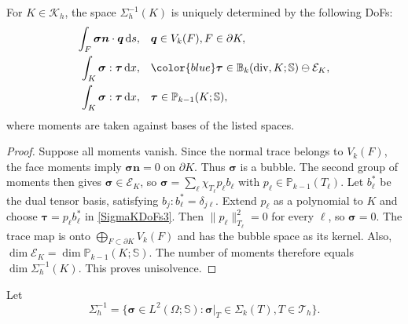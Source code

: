 \documentclass[review,hidelinks,onefignum,onetabnum]{siamart251216}
\renewcommand{\div}{\operatorname{div}}
\newcommand{\dx}{\,{\rm d}x}
\newcommand{\ds}{\,{\rm d}s}
\newcommand{\AI}[1]{{\color{blue}#1}}
\begin{document}
\begin{lemma}\label{lemma_DOF}
For $K\in\mathcal{K}_h$, the space $\Sigma_h^{-1}(K)$ is uniquely determined by the following DoFs:
\begin{subequations}
\label{SigmaKDoFs}
\begin{align}
\label{SigmaKDoFs1}
\int_{F}\boldsymbol{\sigma}\boldsymbol{n}\cdot \boldsymbol{q}\ds,&\quad \boldsymbol{q}\in   V_{k}(F), F\in \partial K , \\
\label{SigmaKDoFs2}
\int_K\boldsymbol{\sigma}:\boldsymbol{\tau} \dx,& \quad  \AI{\boldsymbol\tau\in\mathbb B_k(\div,K;\mathbb S)\ominus\mathcal E_K}, \\
\label{SigmaKDoFs3}
\int_K\boldsymbol{\sigma}:\boldsymbol{\tau} \dx,& \quad  \boldsymbol{\tau}\in \mathbb{P}_{k-1}(K;\mathbb{S}),
\end{align}
\end{subequations}
where moments are taken against bases of the listed spaces.
\end{lemma}
\AI{\begin{proof}
Suppose all moments vanish. Since the normal trace belongs to $V_k(F)$,
the face moments imply $\boldsymbol\sigma\boldsymbol n=0$ on $\partial K$.
Thus $\boldsymbol\sigma$ is a bubble. The second group of moments then gives
$\boldsymbol\sigma\in\mathcal E_K$, so
$\boldsymbol\sigma=\sum_\ell\chi_{T_\ell}p_\ell b_\ell$ with
$p_\ell\in\mathbb P_{k-1}(T_\ell)$.
Let $b_\ell^*$ be the dual tensor basis, satisfying
$b_j:b_\ell^*=\delta_{j\ell}$. Extend $p_\ell$ as a polynomial to $K$ and
choose $\boldsymbol\tau=p_\ell b_\ell^*$ in \eqref{SigmaKDoFs3}. Then
$\|p_\ell\|_{T_\ell}^2=0$ for every $\ell$, so $\boldsymbol\sigma=0$.
The trace map is onto $\bigoplus_{F\subset\partial K}V_k(F)$ and has the
bubble space as its kernel. Also,
$\dim\mathcal E_K=\dim\mathbb P_{k-1}(K;\mathbb S)$.
The number of moments therefore equals $\dim\Sigma_h^{-1}(K)$.
This proves unisolvence.
\end{proof}}

Let
\[
\Sigma_h^{-1} = \{\boldsymbol{\sigma} \in L^2(\Omega;\mathbb{S}) : \boldsymbol{\sigma}|_T \in \Sigma_k(T), T \in \mathcal{T}_h\}.
\]
\end{document}
